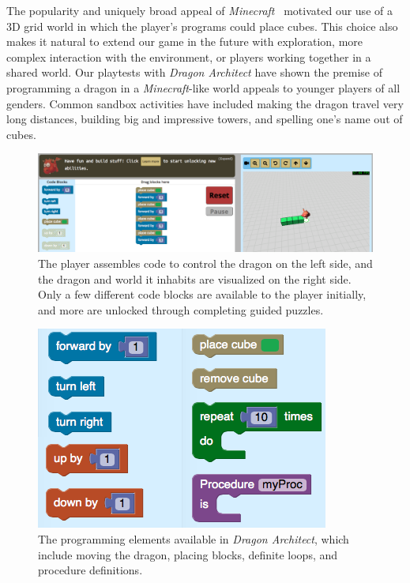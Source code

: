 \documentclass{sig-alternate}
\newcommand{\gametitle}{{\emph{Dragon Architect}}}
\begin{document}
The popularity and uniquely broad appeal of \emph{Minecraft}~\cite{minecraft} motivated our use of a 3D grid world in which the player's programs could place cubes.
This choice also makes it natural to extend our game in the future with exploration, more complex interaction with the environment, or players working together in a shared world.
Our playtests with \emph{Dragon Architect} have shown the premise of programming a dragon in a \emph{Minecraft}-like world appeals to younger players of all genders.
Common sandbox activities have included making the dragon travel very long distances, building big and impressive towers, and spelling one's name out of cubes.

\begin{figure}[t!]
  \centering
  \includegraphics[width=\textwidth]{images/overall-example-cropped}
  \caption{The player assembles code to control the dragon on the left side, and the dragon and world it inhabits are visualized on the right side. Only a few different code blocks are available to the player initially, and more are unlocked through completing guided puzzles.}
  \label{fig:overall}
\end{figure}

\begin{figure}[htb]
  \centering
  \includegraphics[width=\columnwidth]{images/toolbox-wide}
  \caption{The programming elements available in \gametitle{}, which include moving the dragon, placing blocks, definite loops, and procedure definitions.}
  \label{fig:toolbox}
\end{figure}
\end{document}
